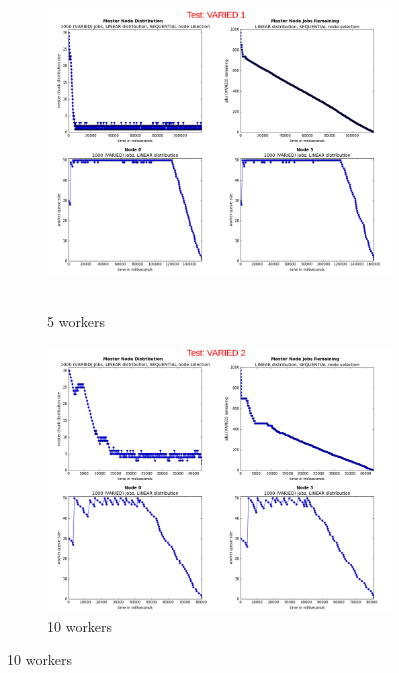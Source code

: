 \documentclass{article}
\begin{document}
\begin{figure}[p] 
  \begin{subfigure}[b]{0.5\linewidth}
    \centering
    \hbox{\hspace{-5.0em} \includegraphics[width=1.2\linewidth]{combined_varied_growing_workers_linear/case_varied_1} }
    \caption{5 workers}
    \label{testLinearVaried5} 
    \vspace{4ex}
  \end{subfigure}%
  \begin{subfigure}[b]{0.5\linewidth}
    \centering
    \includegraphics[width=1.2\linewidth]{combined_varied_growing_workers_linear/case_varied_2} 
    \caption{10 workers} 
    \label{testLinearVaried10} 
    \vspace{4ex}
  \end{subfigure} 
  

\end{figure}
\end{document}
